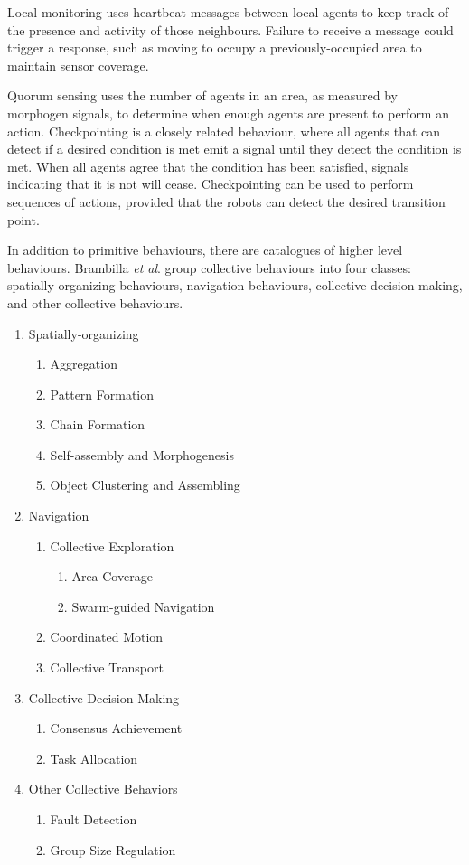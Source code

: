 \documentclass[]{article}
\begin{document}
Local monitoring uses heartbeat messages between local agents to keep track of the presence and activity of those neighbours. Failure to receive a message could trigger a response, such as moving to occupy a previously-occupied area to maintain sensor coverage.

Quorum sensing uses the number of agents in an area, as measured by morphogen signals, to determine when enough agents are present to perform an action. 
Checkpointing is a closely related behaviour, where all agents that can detect if a desired condition is met emit a signal until they detect the condition is met. 
When all agents agree that the condition has been satisfied, signals indicating that it is not will cease. 
Checkpointing can be used to perform sequences of actions, provided that the robots can detect the desired transition point. 

In addition to primitive behaviours, there are catalogues of higher level behaviours. 
Brambilla \textit{et al}. group collective behaviours into four classes: spatially-organizing behaviours, navigation behaviours, collective decision-making, and other collective behaviours.

\begin{enumerate}[noitemsep]
\item Spatially-organizing
	\begin{enumerate}[noitemsep]
	\item Aggregation
	\item Pattern Formation
	\item Chain Formation
	\item Self-assembly and Morphogenesis
	\item Object Clustering and Assembling
	\end{enumerate}
\item Navigation
	\begin{enumerate}[noitemsep]
	\item Collective Exploration
		\begin{enumerate}[noitemsep]
		\item Area Coverage
		\item Swarm-guided Navigation
		\end{enumerate}
	\item Coordinated Motion
	\item Collective Transport
	\end{enumerate}
\item Collective Decision-Making
	\begin{enumerate}[noitemsep]
	\item Consensus Achievement
	\item Task Allocation
	\end{enumerate}
\item Other Collective Behaviors
	\begin{enumerate}[noitemsep]
	\item Fault Detection
	\item Group Size Regulation
	\end{enumerate}
\end{enumerate}
\end{document}
